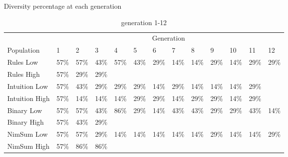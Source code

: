 \begin{table}
	\caption{Diversity percentage at each generation}
	\label{tab:results_diversity}
	\begin{subtable}{\linewidth}
	\centering
	\caption{generation 1-12}
		\begin{tabular}{l|llllllllllll}\hline
		\multicolumn{1}{l}{} & \multicolumn{12}{c}{Generation} \\
		\multicolumn{1}{l}{Population} & 1 & 2 & 3 & 4 & 5 & 6 & 7 & 8 & 9 & 10 & 11 & 12\\\hline
		Rules Low & 57\% & 57\% & 43\% & 57\% & 43\% & 29\% & 14\% & 14\% & 29\% & 14\% & 29\% & 29\% \\
		Rules High & 57\% & 29\% & 29\% & \textemdash & \textemdash & \textemdash & \textemdash & \textemdash & \textemdash & \textemdash & \textemdash & \textemdash \\
		Intuition Low & 57\% & 43\% & 29\% & 29\% & 29\% & 14\% & 29\% & 14\% & 14\% & 14\% & 29\% & \textemdash \\
		Intuition High & 57\% & 14\% & 14\% & 14\% & 29\% & 29\% & 14\% & 29\% & 29\% & 14\% & 29\% & \textemdash \\
		Binary Low & 57\% & 57\% & 43\% & 86\% & 29\% & 14\% & 43\% & 43\% & 29\% & 29\% & 43\% & 14\% \\
		Binary High & 57\% & 43\% & 29\% & \textemdash & \textemdash & \textemdash & \textemdash & \textemdash & \textemdash & \textemdash & \textemdash & \textemdash \\
		NimSum Low & 57\% & 57\% & 29\% & 14\% & 14\% & 14\% & 14\% & 14\% & 29\% & 14\% & 14\% & 29\% \\
		NimSum High & 57\% & 86\% & 86\% & \textemdash & \textemdash & \textemdash & \textemdash & \textemdash & \textemdash & \textemdash & \textemdash & \textemdash \\
		\end{tabular}
	\end{subtable}


\end{table}
